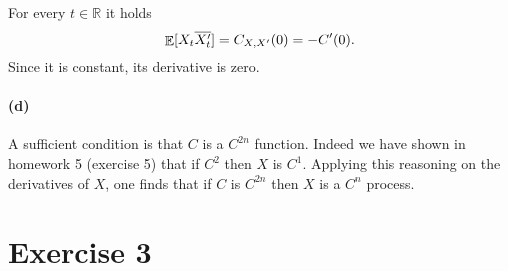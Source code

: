 \documentclass[a4paper,11pt]{article}
\theoremstyle{definition}
\theoremstyle{plain}
\theoremstyle{remark}
\DeclarePairedDelimiter{\parq}{[}{]}
\DeclareMathOperator*{\expval}{\mathbb{E}}
\begin{document}
For every $t\in\mathbb{R}$ it holds
$$
\expval\parq{X_{t}\overline{X_t'}} = C_{X,X'}(0) = -C'(0).
$$
Since it is constant, its derivative is zero.

\paragraph*{(d)}

A sufficient condition is that $C$ is a $C^{2n}$ function. Indeed we have shown in homework 5 (exercise 5) that if $C^2$ then $X$ is $C^1$. Applying this reasoning on the derivatives of $X$, one finds that if $C$ is $C^{2n}$ then $X$ is a $C^n$ process. 
 
\section*{Exercise 3}


 
\end{document}
